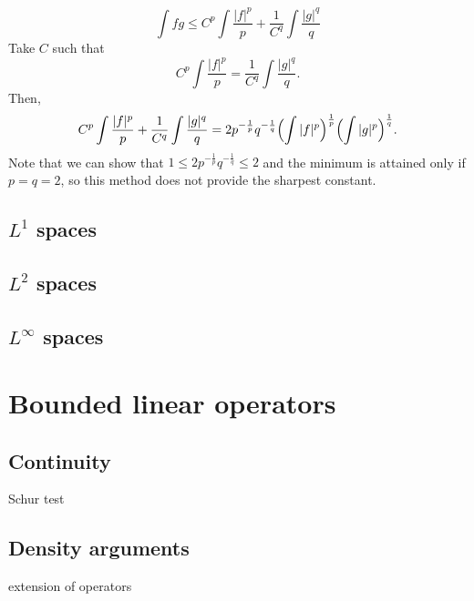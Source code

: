 \documentclass{../../large}
\begin{document}
\begin{prb}
\end{prb}
\begin{pf}
\[\int fg\le C^p\int\frac{|f|^p}p+\frac1{C^q}\int\frac{|g|^q}q\]
Take $C$ such that
\[C^p\int\frac{|f|^p}p=\frac1{C^q}\int\frac{|g|^q}q.\]
Then,
\[C^p\int\frac{|f|^p}p+\frac1{C^q}\int\frac{|g|^q}q=2p^{-\frac1p}q^{-\frac1q}\Bigl(\int|f|^p\Bigr)^{\frac1p}\Bigl(\int|g|^p\Bigr)^{\frac1q}.\]
Note that we can show that $1\le2p^{-\frac1p}q^{-\frac1q}\le2$ and the minimum is attained only if $p=q=2$, so this method does not provide the sharpest constant.
\end{pf}


\section{$L^1$ spaces}

\begin{prb}[Convolution?]
\end{prb}
\begin{prb}
\end{prb}
\begin{prb}
\end{prb}

\section{$L^2$ spaces}

\section{$L^\infty$ spaces}








\chapter{Bounded linear operators}
\section{Continuity}
Schur test

\section{Density arguments}
extension of operators
\end{document}
